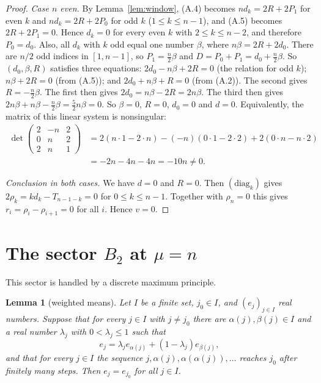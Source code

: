 \documentclass[11pt]{amsart}
\theoremstyle{plain}
\newtheorem{lemma}{Lemma}
\theoremstyle{definition}
\theoremstyle{remark}
\numberwithin{equation}{section}
\begin{document}
\begin{proof}
\emph{Case \(n\) even.} By Lemma~\ref{lem:window}, (A.4) becomes \(nd_k=2R+2P_1\) for
even \(k\) and \(nd_k=2R+2P_0\) for odd \(k\) (\(1\le k\le n-1\)), and (A.5) becomes
\(2R+2P_1=0\). Hence \(d_k=0\) for every even \(k\) with \(2\le k\le n-2\), and therefore
\(P_0=d_0\). Also, all \(d_k\) with \(k\) odd equal one number \(\beta\), where
\(n\beta=2R+2d_0\). There are \(n/2\) odd indices in \([1,n-1]\), so
\(P_1=\frac n2\beta\) and \(D=P_0+P_1=d_0+\frac n2\beta\). So \((d_0,\beta,R)\)
satisfies three equations: \(2d_0-n\beta+2R=0\) (the relation for odd \(k\));
\(n\beta+2R=0\) (from (A.5)); and \(2d_0+n\beta+R=0\) (from (A.2)). The second gives
\(R=-\frac n2\beta\). The first then gives \(2d_0=n\beta-2R=2n\beta\). The third then
gives \(2n\beta+n\beta-\frac n2\beta=\frac52n\beta=0\). So \(\beta=0\), \(R=0\),
\(d_0=0\) and \(d=0\). Equivalently, the matrix of this linear system is nonsingular:
\begin{align*}
\det\begin{pmatrix}2&-n&2\\0&n&2\\2&n&1\end{pmatrix}
&=2(n\cdot1-2\cdot n)-(-n)(0\cdot1-2\cdot2)+2(0\cdot n-n\cdot2)\\
&=-2n-4n-4n=-10n\ne0.
\end{align*}

\emph{Conclusion in both cases.} We have \(d=0\) and \(R=0\). Then \((\mathrm{diag}_k)\)
gives \(2\rho_k=kd_k-T_{n-1-k}=0\) for \(0\le k\le n-1\). Together with \(\rho_n=0\) this
gives \(r_i=\rho_i-\rho_{i+1}=0\) for all \(i\). Hence \(v=0\).
\end{proof}

\section{The sector \texorpdfstring{\(B_2\)}{B2} at
\texorpdfstring{\(\mu=n\)}{mu=n}}\label{sec:B2}

This sector is handled by a discrete maximum principle.

\begin{lemma}[weighted means]\label{lem:means}
Let \(I\) be a finite set, \(j_0\in I\), and \((e_j)_{j\in I}\) real numbers. Suppose that
for every \(j\in I\) with \(j\ne j_0\) there are \(\alpha(j),\beta(j)\in I\) and a real
number \(\lambda_j\) with \(0<\lambda_j\le1\) such that
\[
e_j=\lambda_je_{\alpha(j)}+(1-\lambda_j)e_{\beta(j)},
\]
and that for every \(j\in I\) the sequence \(j,\alpha(j),\alpha(\alpha(j)),\dots\)
reaches \(j_0\) after finitely many steps. Then \(e_j=e_{j_0}\) for all \(j\in I\).
\end{lemma}
\end{document}
